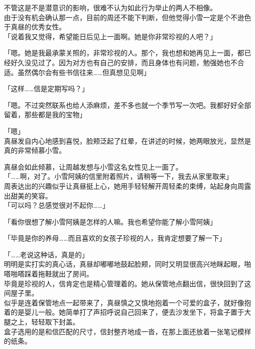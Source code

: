 不管这是不是潜意识的影响，很难不认为如此行为举止的两人不相像。\\

由于没有机会确认那一点，目前的周还不能下判断，但他觉得小雪一定是个不逊色于真昼的优秀女性。\\

「说着我又觉得，希望能日后见上一面啊。她是你非常珍视的人吧？」

「嗯。她是我最承蒙关照的，非常珍视的人。那个，我也想和她再见上一面，都已经好久没见过了。因为对方也有自己的安排，而且身体也有问题，勉强她也不合适。虽然偶尔会有些书信往来……但真想见见啊」

「这样……信是定期写吗？」

「嗯。不过突然联系也给人添麻烦，差不多也就一个季节写一次吧。我都好好全部留着，那些都是我的宝物」

「嗯」\\

真昼发自内心地感到喜悦，脸颊泛起了红晕，在讲述的时候，她两眼放光，显然是真的非常倾慕小雪。

真昼会如此倾慕，让周越发想与小雪这名女性见上一面了。\\

「……啊，对了。小雪阿姨的信里附着照片，请稍等一下，我去从家里取来」\\

周表达出的兴趣似乎让真昼挺上心，她用手轻轻解开周轻柔的束缚，站起身向周露出甜美的笑容。\\

「可以吗？总感觉很对不起你……」

「看你很想了解小雪阿姨是怎样的人嘛。我也希望你能了解小雪阿姨」

「毕竟是你的养母……而且喜欢的女孩子珍视的人，我肯定想要了解一下」

「……老说这种话，真是的」\\

明明是实打实的真心话，真昼却嘟嘟地鼓起脸颊，同时又明显很高兴地眯起眼，啪嗒啪嗒踩着拖鞋就出了房间。\\

毕竟是珍视的人，信肯定也是精心管理着的。她从保管地点翻出信，很快回到了这间屋子里。\\

似乎是连着保管地点一起带来了，真昼慎之又慎地抱着一个可爱的盒子，就好像抱着的是婴儿一般。她简单打了声招呼说自己回来了，便去沙发坐下，将盒子置于大腿之上，轻轻取下封盖。\\

盒子选用的是和信匹配的尺寸，信封整齐地成一沓，在那上面还放着一张笔记模样的纸条。\\

